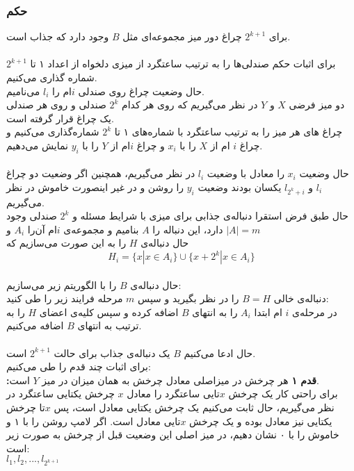 \documentclass[12pt,a4paper]{article}
\begin{document}
\subsubsection*{حکم}
برای 
$2^{k+1}$
چراغ دور میز مجموعه‌ای مثل $B$ وجود دارد که جذاب است.
\\
\\
برای اثبات حکم صندلی‌ها را به ترتیب ساعتگرد از میزی دلخواه از اعداد ۱ تا 
$2^{k+1}$
شماره گذاری می‌کنیم.
\\
حال وضعیت چراغ روی صندلی $i$ام را $l_i$ می‌نامیم.
\\
دو میز فرضی $X$ و $Y$ در نظر می‌گیریم که روی هر کدام $2^k$ صندلی و روی هر صندلی یک چراغ قرار گرفته است.
\\
چراغ های هر میز را به ترتیب ساعتگرد با شماره‌های ۱ تا $2^k$ شماره‌گذاری می‌کنیم و چراغ $i$ ام از $X$ را با $x_i$ و چراغ $i$ام از $Y$ را با $y_i$ نمایش می‌دهیم.
\\\\
حال وضعیت $x_i$ را معادل با وضعیت $l_i$ در نظر می‌گیریم، همچنین اگر وضعیت دو چراغ 
$l_i$ و
$l_{2^k + i}$
یکسان بودند وضعیت $y_i$ را روشن و در غیر اینصورت خاموش در نظر می‌گیریم.
\\
حال طبق فرض استقرا دنباله‌ی جذابی برای میزی با شرایط مسئله و $2^k$ صندلی وجود دارد، این دنباله را $A$ بنامیم و مجموعه‌ی $i$ام آن‌را $A_i$ و $|A| = m$
\\
حال دنباله‌ی $H$ را به این صورت می‌سازیم که 
$$H_i = \{x | x \in A_i \} \cup \{x + 2^k | x \in A_i \}$$
\\
حال دنباله‌ی $B$ را با الگوریتم زیر می‌سازیم:
\\
دنباله‌ی خالی $B = H$ را در نظر بگیرید و سپس $m$ مرحله فرایند زیر را طی کنید:
\\
در مرحله‌ی $i$ ام ابتدا $A_i$ را به انتهای $B$ اضافه کرده و سپس کلیه‌ی اعضای $H$ را به ترتیب به انتهای $B$ اضافه می‌کنیم.
\\\\
حال ادعا می‌کنیم $B$ یک دنباله‌ی جذاب برای حالت 
$2^{k+1}$
است.
\\
برای اثبات چند قدم را طی می‌کنیم:
\\
\textbf{:قدم ۱}
هر چرخش در میزاصلی معادل چرخش به همان میزان در میز $Y$ است.
\\
برای راحتی کار یک چرخش $x$تایی ساعتگرد را معادل $x$ چرخش یکتایی ساعتگرد در نظر می‌گیریم، حال ثابت می‌کنیم یک چرخش یکتایی معادل است، پس $x$تا چرخش یکتایی نیز معادل بوده و یک چرخش $x$تایی معادل است.
اگر لامپ روشن را با ۱ و خاموش را با ۰ نشان دهیم، در میز اصلی این وضعیت قبل از چرخش به صورت زیر است:\\
$l_1, l_2, ..., l_{2^{k+1}}$
\end{document}
